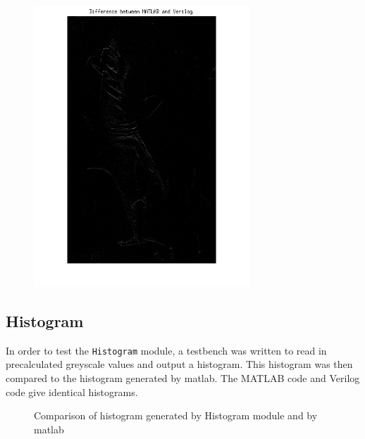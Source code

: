 \documentclass[12pt]{article}
\begin{document}
\begin{figure}[H]
  \centering
  \includegraphics[height=300pt, angle=-90]{Images/RGB2GRAY/Difference.png}
\end{figure}

    
  \newpage
  \subsection{Histogram}
  In order to test the \texttt{Histogram} module, a testbench was written to read in precalculated greyscale values and output a histogram. This histogram was then compared to the histogram generated by matlab. The MATLAB code and Verilog code give identical histograms.
  \begin{figure}[H]
    \caption{Comparison of histogram generated by Histogram module and by matlab}
    \label{fig:histogram_testbench}
  \end{figure} 
  
  \newpage
\end{document}

